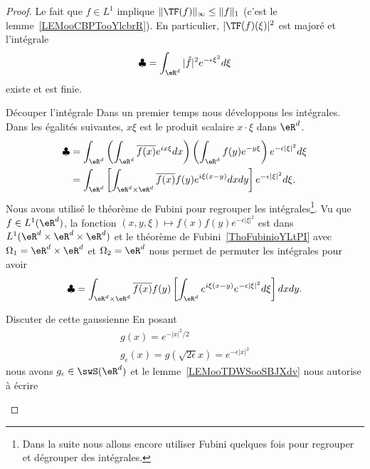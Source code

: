 \begin{proof}
	Le fait que \( f\in L^1\) implique \( \| \TF(f) \|_{\infty}\leq \| f \|_1\) (c'est le lemme~\ref{LEMooCBPTooYlcbrR}). En particulier, \( | \TF(f)(\xi) |^2\) est majoré et l'intégrale
	\begin{equation}
		\clubsuit=\int_{\eR^d}| \hat f |^2 e^{-\epsilon\xi^2}d\xi
	\end{equation}
	existe et est finie.
	\begin{subproof}
		\item[Découper l'intégrale]
		Dans un premier temps nous développons les intégrales. Dans les égalités suivantes, \( x\xi\) est le produit scalaire \( x\cdot \xi\) dans \( \eR^d\).
		\begin{subequations}
			\begin{align}
				\clubsuit & =\int_{\eR^d}\left( \int_{\eR^d} \overline{ f(x) } e^{ix\xi}dx \right)\left( \int_{\eR^d} f(y)  e^{-y\xi} \right) e^{- \epsilon | \xi |^2}d\xi \\
				          & =\int_{\eR^d}\left[ \int_{\eR^d\times \eR^d}  \overline{ f(x) }  f(y) e^{i\xi(x-y)}dxdy \right] e^{-\epsilon| \xi |^2}d\xi.
			\end{align}
		\end{subequations}
		Nous avons utilisé le théorème de Fubini pour regrouper les intégrales\footnote{Dans la suite nous allons encore utiliser Fubini quelques fois pour regrouper et dégrouper des intégrales.}. Vu que \( f\in L^1(\eR^d)\), la fonction \( (x,y,\xi)\mapsto f(x)f(y) e^{-\epsilon| \xi |^2}\) est dans \( L^1(\eR^d\times \eR^d\times \eR^d)\) et le théorème de Fubini~\ref{ThoFubinioYLtPI} avec \( \Omega_1=\eR^d\times \eR^d\) et \( \Omega_2=\eR^d\)  nous permet de permuter les intégrales pour avoir
		\begin{equation}        \label{EQooSUYWooCmtFeF}
			\clubsuit=\int_{\eR^d\times \eR^d} \overline{ f(x) }f(y)  \left[ \int_{\eR^d} e^{i\xi(x-y)} e^{-\epsilon| \xi |^2}d\xi \right]dxdy.
		\end{equation}
		\item[Discuter de cette gaussienne]
		En posant
		\begin{subequations}
			\begin{align}
				g(x)= e^{-| x |^2/2} \\
				g_{\epsilon}(x)=g(\sqrt{ 2\epsilon }x)= e^{-\epsilon| x |^2}
			\end{align}
		\end{subequations}
		nous avons \( g_{\epsilon}\in \swS(\eR^d)\) et le lemme~\ref{LEMooTDWSooSBJXdv} nous autorise à écrire

\end{subproof}
\end{proof}

